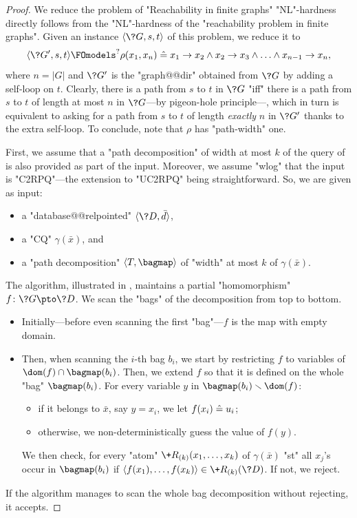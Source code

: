 \begin{proof}
	We reduce the problem of "Reachability in finite graphs"
	"NL"-hardness directly follows from the "NL"-hardness of
	the "reachability problem in finite graphs".
	Given an instance $\tup{\?G,s,t}$ of this problem,
	we reduce it to
	\[
		\tup{\?G', s, t} \FOmodels^?
		\rho(x_1,x_n) \defeq x_1 \to x_2 \land x_2 \to x_3 \land \dotsc \land x_{n-1} \to x_n,
	\]
	where $n = |G|$ and $\?G'$ is the "graph@@dir" obtained
	from $\?G$ by adding a self-loop on $t$.
	Clearly, there is a path from $s$ to $t$
	in $\?G$ "iff" there is a path from $s$ to $t$ of length at most $n$ in $\?G$---by pigeon-hole principle---, which in turn is equivalent to asking for a path from $s$ to $t$
	of length \emph{exactly} $n$ in $\?G'$ thanks to the extra self-loop.
	To conclude, note that $\rho$ has "path-width" one.

	First, we assume that a "path decomposition" of width at most $k$ of the query of
	is also provided as part of the input. Moreover, we assume "wlog" that the input is "C2RPQ"---the extension to "UC2RPQ" being straightforward. So, we are given as input:
	\begin{itemize}
		\item a "database@@relpointed" $\tup{\?D, \bar d}$,
		\item a "CQ" $\gamma(\bar x)$, and
		\item a "path decomposition" $\langle T, \bagmap \rangle$ of "width" at 	
			most $k$ of $\gamma(\bar x)$.
	\end{itemize}
	The algorithm, illustrated in , maintains a partial "homomorphism"
	$f\colon \?G \pto \?D$.
	We scan the "bags" of the decomposition from top to bottom.
	\begin{itemize}
		\item Initially---before even scanning the first "bag"---$f$ is the map with empty domain.
		\item Then, when scanning the $i$-th bag $b_i$,
			we start by restricting $f$ to variables of $\dom(f)\cap \bagmap(b_i)$.
			Then, we extend $f$ so that it is defined on the whole "bag" $\bagmap(b_i)$.
			For every variable $y$ in $\bagmap(b_i) \smallsetminus\dom(f)$:
			\begin{itemize}
				\item if it belongs to $\bar x$, say $y = x_i$, 
					we let $f(x_i) \mathrel{\hat{=}} u_i$;
				\item otherwise, we non-deterministically guess the value of $f(y)$.
			\end{itemize}
			We then check, for every "atom" $\+R_{(k)}(x_1,\hdots,x_k)$ of $\gamma(\bar x)$ 
			"st" all $x_j$'s occur in $\bagmap(b_i)$ if
			$\tup{f(x_1), \dotsc, f(x_k)} \in \+R_{(k)}(\?D)$.
			If not, we reject. 
	\end{itemize}
	If the algorithm manages to scan the whole bag decomposition without rejecting, it accepts.


\end{proof}
